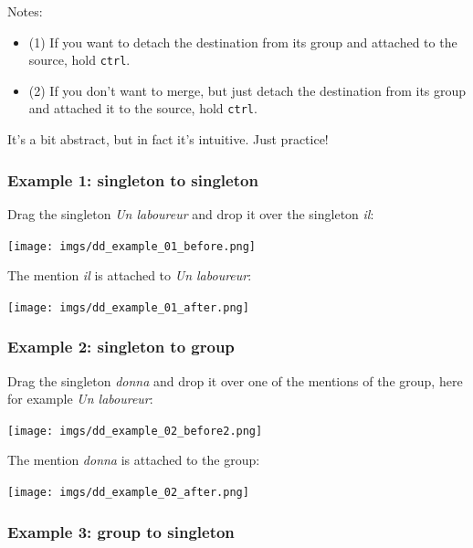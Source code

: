 \documentclass[12pt]{article}
\begin{document}
Notes:
\begin{itemize}
   \item (1) If you want to detach the destination from its group and
   attached to the source, hold \verb|ctrl|.
   \item (2) If you don't want to merge, but just detach the destination from
   its group and attached it to the source, hold \verb|ctrl|.
\end{itemize}

It's a bit abstract, but in fact it's intuitive.  Just practice!


 \subsubsection{Example 1: singleton to singleton}

Drag the singleton \emph{Un laboureur} and drop it over the singleton
\emph{il}:\nopagebreak

\texttt{[image: imgs/dd\_example\_01\_before.png]}

The mention \emph{il} is attached to \emph{Un laboureur}:\nopagebreak

\texttt{[image: imgs/dd\_example\_01\_after.png]}


 \subsubsection{Example 2: singleton to group}

Drag the singleton \emph{donna} and drop it over one of the mentions of the
group, here for example \emph{Un laboureur}:\nopagebreak

\texttt{[image: imgs/dd\_example\_02\_before2.png]}

The mention \emph{donna} is attached to the group:\nopagebreak

\texttt{[image: imgs/dd\_example\_02\_after.png]}

 \subsubsection{Example 3: group to singleton}
\end{document}
